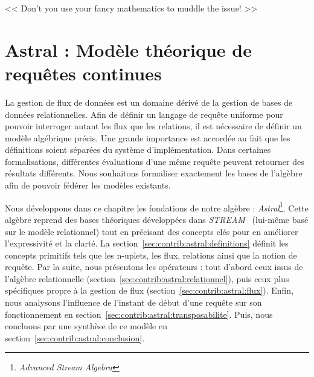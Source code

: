 \begin{savequote}[6cm]
<< Don't you use your fancy mathematics to muddle the issue! >>
\end{savequote}

\chapter{Astral : Modèle théorique de requêtes continues}\label{chap:contrib:astral}
\chaptertoc

La gestion de flux de données est un domaine dérivé de la gestion de bases de données relationnelles. Afin de définir un langage de requête uniforme pour pouvoir interroger autant les flux que les relations, il est nécessaire de définir un modèle algébrique précis. Une grande importance est accordée au fait que les définitions soient séparées du système d'implémentation. Dans certaines formalisations, différentes évaluations d'une même requête peuvent retourner des résultats différents. Nous souhaitons formaliser exactement les bases de l'algèbre afin de pouvoir fédérer les modèles existants.

Nous développons dans ce chapitre les fondations de notre algèbre : \textit{Astral}\footnote{\textit{Advanced Stream Algebra}}. Cette algèbre reprend des bases théoriques développées dans \textit{STREAM}~\cite{Arasu:stream} (lui-même basé sur le modèle relationnel) tout en précisant des concepts clés pour en améliorer l'expressivité et la clarté. La section~\ref{sec:contrib:astral:definitions} définit les concepts primitifs tels que les n-uplets, les flux, relations ainsi que la notion de requête. Par la suite, nous présentons les opérateurs : tout d'abord ceux issus de l'algèbre relationnelle (section~\ref{sec:contrib:astral:relationnel}), puis ceux plus spécifiques propre à la gestion de flux (section~\ref{sec:contrib:astral:flux}). Enfin, nous analysons l'influence de l'instant de début d'une requête sur son fonctionnement en section~\ref{sec:contrib:astral:transposabilite}. Puis, nous concluons par une synthèse de ce modèle en section~\ref{sec:contrib:astral:conclusion}.






